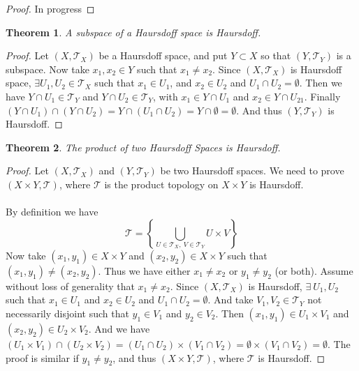 \documentclass{article}
\newtheorem{theorem}{Theorem}[section]
\theoremstyle{remark}
\theoremstyle{definition}
\begin{document}
\begin{proof}
In progress
\end{proof}

\begin{theorem}
A subspace of a Haursdoff space is Haursdoff.
\end{theorem}

\begin{proof}
Let $(X, \mathcal{T}_X)$ be a Haursdoff space, and put $Y \subset X$ so that $(Y, \mathcal{T}_Y)$ is a subspace. Now take $x_1, x_2 \in Y$ such that $x_1 \neq x_2$. Since $(X, \mathcal{T}_X)$ is Haursdoff space, $\exists U_1, U_2 \in \mathcal{T}_X$ such that $x_1 \in U_1$, and $x_2 \in U_2$ and $U_1 \cap U_2 = \emptyset$. Then we have $Y \cap U_1 \in \mathcal{T}_Y$ and $Y \cap U_2 \in \mathcal{T}_Y$, with $x_1 \in Y \cap U_1$ and $x_2 \in Y \cap U_21$. Finally $( Y \cap U_1) \cap (Y \cap U_2) = Y \cap (U_1 \cap U_2) = Y \cap \emptyset = \emptyset$. And thus $(Y, \mathcal{T}_Y)$ is Haursdoff.
\end{proof}

\medskip

\begin{theorem}
The product of two Haursdoff Spaces is Haursdoff.
\end{theorem}

\begin{proof}
Let $(X, \mathcal{T}_X)$ and $(Y, \mathcal{T}_Y)$ be two Haursdoff spaces. We need to prove $(X \times Y, \mathcal{T})$, where $\mathcal{T}$ is the product topology on $X \times Y$ is Haursdoff. \\ \\ By definition we have $$\mathcal{T} = \left\{\bigcup_{U \in \mathcal{T}_X, \ V \in \mathcal{T}_Y} U \times V \right\}$$ Now take $(x_1, y_1) \in X \times Y$ and $(x_2, y_2) \in X \times Y$ such that $(x_1, y_1) \neq (x_2, y_2)$. Thus we have either $x_1 \neq x_2$ or $y_1 \neq y_2$ (or both). Assume without loss of generality that $x_1 \neq x_2$. Since $(X, \mathcal{T}_X)$ is Haursdoff, $\exists \ U_1, U_2$ such that $x_1 \in U_1$ and $x_2 \in U_2$ and $U_1 \cap U_2 = \emptyset$. And take $V_1, V_2 \in \mathcal{T}_Y$ not necessarily disjoint such that $y_1 \in V_1$ and $y_2 \in V_2$. Then $(x_1, y_1) \in U_1 \times V_1$ and $(x_2, y_2) \in U_2 \times V_2$. And we have $(U_1 \times V_1) \cap  (U_2 \times V_2) = (U_1 \cap U_2) \times (V_1 \cap V_2) = \emptyset \times (V_1 \cap V_2) = \emptyset$. The proof is similar if $y_1 \neq y_2$, and thus $(X \times Y, \mathcal{T})$, where $\mathcal{T}$ is Haursdoff.
\end{proof}
\end{document}

